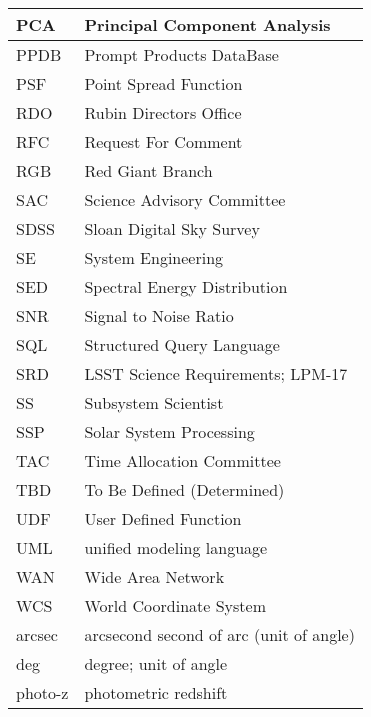 \begin{longtable}{p{}p{}}
PCA & Principal Component Analysis \\\hline
PPDB & Prompt Products DataBase \\\hline
PSF & Point Spread Function \\\hline
RDO & Rubin Directors Office \\\hline
RFC & Request For Comment \\\hline
RGB & Red Giant Branch \\\hline
SAC & Science Advisory Committee \\\hline
SDSS & Sloan Digital Sky Survey \\\hline
SE & System Engineering \\\hline
SED & Spectral Energy Distribution \\\hline
SNR & Signal to Noise Ratio \\\hline
SQL & Structured Query Language \\\hline
SRD & LSST Science Requirements; LPM-17 \\\hline
SS & Subsystem Scientist \\\hline
SSP & Solar System Processing \\\hline
TAC & Time Allocation Committee \\\hline
TBD & To Be Defined (Determined) \\\hline
UDF & User Defined Function \\\hline
UML & unified modeling language \\\hline
WAN & Wide Area Network \\\hline
WCS & World Coordinate System \\\hline
arcsec & arcsecond second of arc (unit of angle) \\\hline
deg & degree; unit of angle \\\hline
photo-z & photometric redshift \\\hline
\end{longtable}
